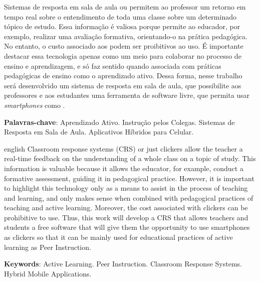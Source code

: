 \setlength{\absparsep}{18pt} %
\begin{resumo}
  Sistemas de resposta em sala de aula ou {\clickers} permitem ao professor um retorno
  em tempo real sobre o entendimento de toda uma classe sobre um determinado
  tópico de estudo. Essa informação é valiosa porque permite ao educador, por exemplo,
  realizar uma avaliação formativa, orientando-o na prática pedagógica.
  No entanto, o custo associado aos {\clickers} podem ser proibitivos ao uso.
  É importante destacar essa tecnologia apenas como um meio para colaborar no processo
  de ensino e aprendizagem, e só faz sentido quando associada com práticas
  pedagógicas de ensino como o aprendizado ativo.
  Dessa forma, nesse trabalho será desenvolvido um sistema de resposta em sala de aula,
  que possibilite aos professores e aos estudantes uma ferramenta de software livre, que permita
  usar \textit{smartphones} como {\clickers}.

 \textbf{Palavras-chave}:  Aprendizado Ativo. Instrução pelos Colegas. Sistemas de Resposta em Sala de Aula. Aplicativos Híbridos para Celular.
\end{resumo}

\begin{resumo}[Abstract]
 \begin{otherlanguage*}{english}
   Classroom response systems (CRS) or just clickers allow the teacher a real-time feedback on the understanding of a whole class on a topic of study. This information is valuable because it allows the educator, for example, conduct a formative assessment, guiding it in pedagogical practice.
   However, it is important to highlight this technology only as a means to assist in the process of teaching and learning, and only makes sense when combined with pedagogical practices of teaching and active learning. Moreover, the cost associated with clickers can be prohibitive to use. Thus, this work will develop a CRS that allows teachers and students a free software that will give them the opportunity to use smartphones as clickers so that it can be mainly used for educational practices of active learning as Peer Instruction.

   \noindent
   \textbf{Keywords}: Active Learning. Peer Instruction. Classroom Response Systems. Hybrid Mobile Applications.
 \end{otherlanguage*}
\end{resumo}

